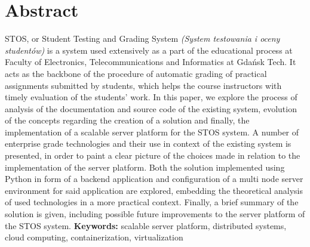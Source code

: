 \chapter*{Abstract}
\indent STOS, or Student Testing and Grading System \textit{(System testowania i oceny studentów)} is a system used extensively as a part of the educational process at Faculty of Electronics, Telecommunications and Informatics at Gdańsk Tech. It acts as the backbone of the procedure of automatic grading of practical assignments submitted by students, which helps the course instructors with timely evaluation of the students' work.
\newline \noindent In this paper, we explore the process of analysis of the documentation and source code of the existing system, evolution of the concepts regarding the creation of a solution and finally, the implementation of a scalable server platform for the STOS system. A number of enterprise grade technologies and their use in context of the existing system is presented, in order to paint a clear picture of the choices made in relation to the implementation of the server platform. Both the solution implemented using Python in form of a backend application and configuration of a multi node server environment for said application are explored, embedding the theoretical analysis of used technologies in a more practical context. Finally, a brief summary of the solution is given, including possible future improvements to the server platform of the STOS system.
\vspace{0.5cm}\newline
\textbf{Keywords:} scalable server platform, distributed systems, cloud computing, containerization, virtualization \vspace{0.5cm}
